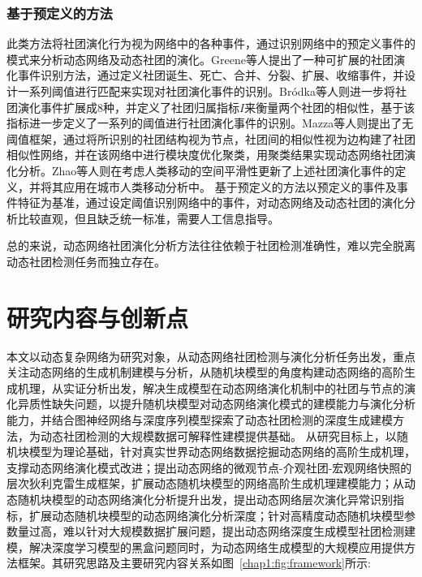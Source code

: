 \subsubsection{基于预定义的方法}
此类方法将社团演化行为视为网络中的各种事件，通过识别网络中的预定义事件的模式来分析动态网络及动态社团的演化。Greene等人\cite{greene2010tracking}提出了一种可扩展的社团演化事件识别方法，通过定义社团诞生、死亡、合并、分裂、扩展、收缩事件，并设计一系列阈值进行匹配来实现对社团演化事件的识别。Br{\'o}dka等人\cite{brodka2013ged}则进一步将社团演化事件扩展成$8$种，并定义了社团归属指标$I$来衡量两个社团的相似性，基于该指标进一步定义了一系列的阈值进行社团演化事件的识别。Mazza等人\cite{mazza2023modularity}则提出了无阈值框架，通过将所识别的社团结构视为节点，社团间的相似性视为边构建了社团相似性网络，并在该网络中进行模块度优化聚类，用聚类结果实现动态网络社团演化分析。Zhao等人\cite{zhao2023dynamic}则在考虑人类移动的空间平滑性更新了上述社团演化事件的定义，并将其应用在城市人类移动分析中。
基于预定义的方法以预定义的事件及事件特征为基准，通过设定阈值识别网络中的事件，对动态网络及动态社团的演化分析比较直观，但且缺乏统一标准，需要人工信息指导。

总的来说，动态网络社团演化分析方法往往依赖于社团检测准确性，难以完全脱离动态社团检测任务而独立存在。

\section{研究内容与创新点}

本文以动态复杂网络为研究对象，从动态网络社团检测与演化分析任务出发，重点关注动态网络的生成机制建模与分析，从随机块模型的角度构建动态网络的高阶生成机理，从实证分析出发，解决生成模型在动态网络演化机制中的社团与节点的演化异质性缺失问题，以提升随机块模型对动态网络演化模式的建模能力与演化分析能力，并结合图神经网络与深度序列模型探索了动态社团检测的深度生成建模方法，为动态社团检测的大规模数据可解释性建模提供基础。
从研究目标上，以随机块模型为理论基础，针对真实世界动态网络数据挖掘动态网络的高阶生成机理，支撑动态网络演化模式改进；提出动态网络的微观节点-介观社团-宏观网络快照的层次狄利克雷生成框架，扩展动态随机块模型的网络高阶生成机理建模能力；从动态随机块模型的动态网络演化分析提升出发，提出动态网络层次演化异常识别指标，扩展动态随机块模型的动态网络演化分析深度；针对高精度动态随机块模型参数量过高，难以针对大规模数据扩展问题，提出动态网络深度生成模型社团检测建模，解决深度学习模型的黑盒问题同时，为动态网络生成模型的大规模应用提供方法框架。其研究思路及主要研究内容关系如图~\ref{chap1:fig:framework}所示:

